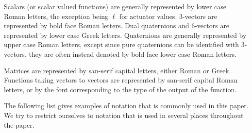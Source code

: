 \documentclass[reqno,12pt]{amsart}
\begin{document}
Scalars (or scalar valued functions) are generally represented by lower case Roman letters, the exception being $\ell$ for actuator values.  3-vectors are represented by bold face Roman letters.  Dual quaternions and 6-vectors are represented by lower case Greek letters.  Quaternions are generally represented by upper case Roman letters, except since pure quaternions can be identified with 3-vectors, they are often instead denoted by bold face lower case Roman letters.

Matrices are represented by san-serif capital letters, either Roman or Greek.  Functions taking vectors to vectors are represented by san-serif capital Roman letters, or by the font corresponding to the type of the output of the function.

The following list gives examples of notation that is commonly used in this paper.  We try to restrict ourselves to notation that is used in several places throughout the paper.
\end{document}
